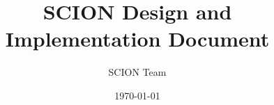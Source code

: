 \documentclass[12pt]{article}
\title{SCION Design and Implementation Document}
\author{SCION Team}
\date{\today}
\begin{document}
\maketitle
\tableofcontents
%
\newpage
\setcounter{page}{1}
%


%





%










\nocite{ZHHCPA2011}

\appendix

\end{document}
